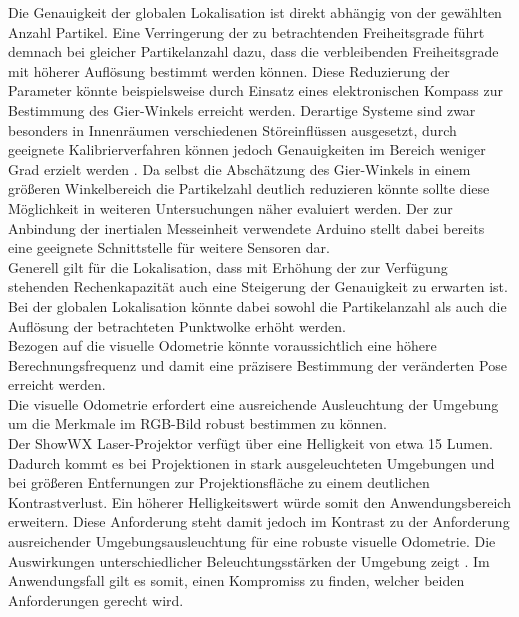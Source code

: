 Die Genauigkeit der globalen Lokalisation ist direkt abhängig von der gewählten Anzahl Partikel. Eine Verringerung der zu betrachtenden Freiheitsgrade führt demnach bei gleicher Partikelanzahl dazu, dass die verbleibenden Freiheitsgrade mit höherer Auflösung bestimmt werden können. Diese Reduzierung der Parameter könnte beispielsweise durch Einsatz eines elektronischen Kompass zur Bestimmung des Gier-Winkels erreicht werden. Derartige Systeme sind zwar besonders in Innenräumen verschiedenen Störeinflüssen ausgesetzt, durch geeignete Kalibrierverfahren können jedoch Genauigkeiten im Bereich weniger Grad erzielt werden \cite{Li2011}. Da selbst die Abschätzung des Gier-Winkels in einem größeren Winkelbereich die Partikelzahl deutlich reduzieren könnte sollte diese Möglichkeit in weiteren Untersuchungen näher evaluiert werden. Der zur Anbindung der inertialen Messeinheit verwendete Arduino stellt dabei bereits eine geeignete Schnittstelle für weitere Sensoren dar.\\

Generell gilt für die Lokalisation, dass mit Erhöhung der zur Verfügung stehenden Rechenkapazität auch eine Steigerung der Genauigkeit zu erwarten ist. Bei der globalen Lokalisation könnte dabei sowohl die Partikelanzahl als auch die Auflösung der betrachteten Punktwolke erhöht werden.\\
Bezogen auf die visuelle Odometrie könnte voraussichtlich eine höhere Berechnungsfrequenz und damit eine präzisere Bestimmung der veränderten Pose erreicht werden.\\



Die visuelle Odometrie erfordert eine ausreichende Ausleuchtung der Umgebung um die Merkmale im RGB-Bild robust bestimmen zu können.\\
 
Der ShowWX Laser-Projektor verfügt über eine Helligkeit von etwa 15 Lumen. Dadurch kommt es bei Projektionen in stark ausgeleuchteten Umgebungen und bei größeren Entfernungen zur Projektionsfläche zu einem deutlichen Kontrastverlust. Ein höherer Helligkeitswert würde somit den Anwendungsbereich erweitern. Diese Anforderung steht damit jedoch im Kontrast zu der Anforderung ausreichender Umgebungsausleuchtung für eine robuste visuelle Odometrie. Die Auswirkungen unterschiedlicher Beleuchtungsstärken der Umgebung zeigt . Im Anwendungsfall gilt es somit, einen Kompromiss zu finden, welcher beiden Anforderungen gerecht wird.\\

